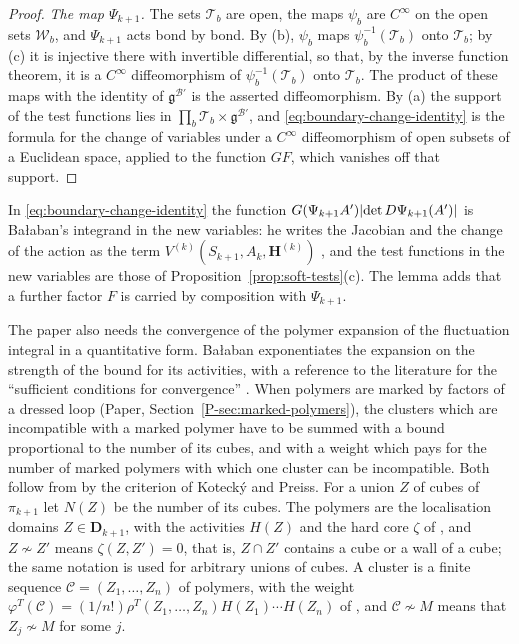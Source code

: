 \documentclass[11pt]{preprint}
\DeclarePairedDelimiter{\abs}{\lvert}{\rvert}
\numberwithin{equation}{section}
\theoremstyle{definition}
\theoremstyle{remark}
\theoremstyle{plain}
\begin{document}
\begin{proof}
\emph{The map $\Psi_{k+1}$.} The sets $\mathcal T_b$ are open, the maps $\psi_b$ are $C^\infty$ on the open sets $\mathcal W_b$, and $\Psi_{k+1}$ acts bond by bond. By (b), $\psi_b$ maps $\psi_b^{-1}(\mathcal T_b)$ onto $\mathcal T_b$; by (c) it is injective there with invertible differential, so that, by the inverse function theorem, it is a $C^\infty$ diffeomorphism of $\psi_b^{-1}(\mathcal T_b)$ onto $\mathcal T_b$. The product of these maps with the identity of $\mathfrak g^{\mathcal B'}$ is the asserted diffeomorphism. By (a) the support of the test functions lies in $\prod_b\mathcal T_b \times \mathfrak g^{\mathcal B'}$, and \eqref{eq:boundary-change-identity} is the formula for the change of variables under a $C^\infty$ diffeomorphism of open subsets of a Euclidean space, applied to the function $GF$, which vanishes off that support.
\end{proof}

In \eqref{eq:boundary-change-identity} the function $G(\Psi_{k+1}A')\abs{\det D\Psi_{k+1}(A')}$ is Ba{\l}aban's integrand in the new variables: he writes the Jacobian and the change of the action as the term $V^{(k)}(S_{k+1}, A_k, \mathbf H^{(k)})$ \cite[p.~269]{BalabanCRE}, and the test functions in the new variables are those of Proposition~\ref{prop:soft-tests}(c). The lemma adds that a further factor $F$ is carried by composition with $\Psi_{k+1}$.

The paper also needs the convergence of the polymer expansion of the fluctuation integral in a quantitative form. Ba{\l}aban exponentiates the expansion on the strength of the bound \cite[(2.38), p.~20]{BalabanRG2} for its activities, with a reference to the literature for the ``sufficient conditions for convergence'' \cite[p.~20]{BalabanRG2}. When polymers are marked by factors of a dressed loop (Paper, Section~\ref{P-sec:marked-polymers}), the clusters which are incompatible with a marked polymer have to be summed with a bound proportional to the number of its cubes, and with a weight which pays for the number of marked polymers with which one cluster can be incompatible. Both follow from \cite[(2.38)]{BalabanRG2} by the criterion of Koteck\'y and Preiss. For a union $Z$ of cubes of $\pi_{k+1}$ let $N(Z)$ be the number of its cubes. The polymers are the localisation domains $Z \in \mathbf D_{k+1}$, with the activities $H(Z)$ and the hard core $\zeta$ of \cite[(2.9)--(2.11), p.~14]{BalabanRG2}, and $Z \not\sim Z'$ means $\zeta(Z, Z') = 0$, that is, $Z \cap Z'$ contains a cube or a wall of a cube; the same notation is used for arbitrary unions of cubes. A cluster is a finite sequence $\mathcal C = (Z_1, \dots, Z_n)$ of polymers, with the weight $\varphi^T(\mathcal C) = (1/n!)\rho^T(Z_1, \dots, Z_n)H(Z_1) \cdots H(Z_n)$ of \cite[(2.12)]{BalabanRG2}, and $\mathcal C \not\sim M$ means that $Z_j \not\sim M$ for some $j$.
\end{document}

